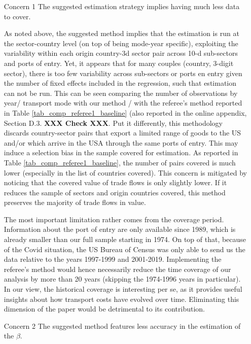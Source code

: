 \documentclass[a4paper,11pt]{article}
\begin{document}
\begin{itemize}
\item[Concern 1] The suggested estimation strategy implies having much less data to cover.

As noted above, the suggested method implies that the estimation is run at the sector-country level (on top of being mode-year specific), exploiting the variability within each origin country-3d sector pair across 10-d sub-sectors and ports of entry. Yet, it appears that for many couples (country, 3-digit sector), there is too few variability across sub-sectors or ports en entry given the number of fixed effects included in the regression, such that estimation can not be run. This can be seen comparing the number of observations by year/ transport mode with our method / with the referee's method reported in Table \ref{tab_comp_referee1_baseline} (also reported in the online appendix, Section D.3. \textbf{XXX Check XXX}. Put it differently, this methodology discards country-sector pairs that export a limited range of goods to the US and/or which arrive in the USA through the same ports of entry. This may induce a selection bias in the sample covered for estimation. As reported in Table  \ref{tab_comp_referee1_baseline}, the number of pairs covered is much lower (especially in the list of countries covered). This concern is mitigated by noticing that the covered value of trade flows is only slightly lower. If it reduces the sample of sectors and origin countries covered, this method preserves the majority of trade flows in value.

The most important limitation rather comes from the coverage period. Information about the port of entry are only available since 1989, which is already smaller than our full sample starting in 1974. On top of that, because of the Covid situation, the US Bureau of Census was only able to send us the data relative to the years 1997-1999 and 2001-2019. Implementing the referee's method would hence necessarily reduce the time coverage of our analysis by more than 20 years (skipping the 1974-1996 years in particular). In our view, the historical coverage is interesting per se, as it provides useful insights about how transport costs have evolved over time. Eliminating this dimension of the paper would be detrimental to its contribution.


\item[Concern 2] The suggested method features less accuracy in the estimation of the $\beta$.


\end{itemize}
\end{document}
